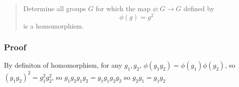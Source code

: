 \documentclass[11pt]{article}
\begin{document}
\begin{quote}
Determine all groups \(G\) for which the map \(\phi : G \rightarrow G\) defined by
\begin{equation}
\label{eq:1}
\phi(g) = g^{2}
\end{equation}
is a homomorphism.
\end{quote}
\subsubsection{Proof}
\label{sec:orgc5db8da}
By definiton of homomorphism, for any \(g_1, g_2\), \(\phi(g_1 g_2) =
\phi(g_{1}) \phi(g_{2})\), so \((g_1 g_{2})^{2}  =
g_{1}^{2} g_{2}^{2}\), so \(g_1 g_2 g_1 g_2 = g_1 g_1 g_2 g_2\) so \(g_2 g_1 =
g_1 g_2\)
\end{document}
